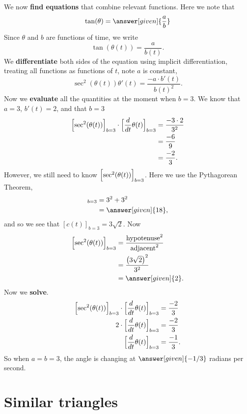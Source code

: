 \documentclass{ximera}
\begin{document}
\begin{example}
\begin{explanation}
    We now \textbf{find equations} that combine relevant
    functions. Here we note that
    \[
    \tan(\theta) = \answer[given]{\frac{a}{b}}
    \]
    Since $\theta$ and $b$ are functions of time, we write
    \[
    \tan(\theta(t)) = \frac{a}{b(t)}.
    \]
    We \textbf{differentiate}  both sides of  the equation using
    implicit differentiation, treating all functions as functions of
    $t$, note $a$ is constant,
    \[
    \sec^2(\theta(t))\theta'(t) = \frac{-a\cdot b'(t)}{b(t)^2}.
    \]
    Now we \textbf{evaluate} all the quantities at the moment when $b=3$.  We
    know that $a=3$, $b'(t) = 2$, and that $b = 3$
    \begin{align*}
    \Bigl[\sec^2(\theta(t))\Bigr]_{b=3}\cdot \Bigl[\dfrac{d}{dt}\theta(t)\Bigr]_{b=3} &= \frac{-3\cdot 2}{3^2}\\
    &= \frac{-6}{9}\\
    &= \frac{-2}{3}.
    \end{align*}
    However, we still need to know $ \Bigl[\sec^2(\theta(t))\Bigr]_{b=3}$. Here we use the
    Pythagorean Theorem,
    \begin{align*}
    [c^2(t)]_{b=3} &= 3^2 + 3^2\\
    &=\answer[given]{18},
    \end{align*}
    and so we see that $[c(t)]_{b=3} = 3\sqrt{2}$. Now
    \begin{align*}
     \Bigl[\sec^2(\theta(t))\Bigr]_{b=3} &= \frac{\mathrm{hypotenuse}^2}{\mathrm{adjacent}^2}\\
      &= \frac{\left(3\sqrt{2}\right)^2}{3^2}\\
      &= \answer[given]{2}.
    \end{align*}
   Now we \textbf{solve}.
    \begin{align*}
    \Bigl[\sec^2(\theta(t))\Bigr]_{b=3}\cdot \Bigl[\dfrac{d}{dt}\theta(t)\Bigr]_{b=3}  &= \frac{-2}{3}\\
      2\cdot \Bigl[\dfrac{d}{dt}\theta(t)\Bigr]_{b=3}  &= \frac{-2}{3}\\
     \Bigl[\dfrac{d}{dt}\theta(t)\Bigr]_{b=3} &= \frac{-1}{3}.
    \end{align*}
    So when $a=b=3$, the angle is changing at $\answer[given]{-1/3}$
    radians per second.
  \end{explanation}
\end{example}



\section{Similar triangles}
\end{document}
